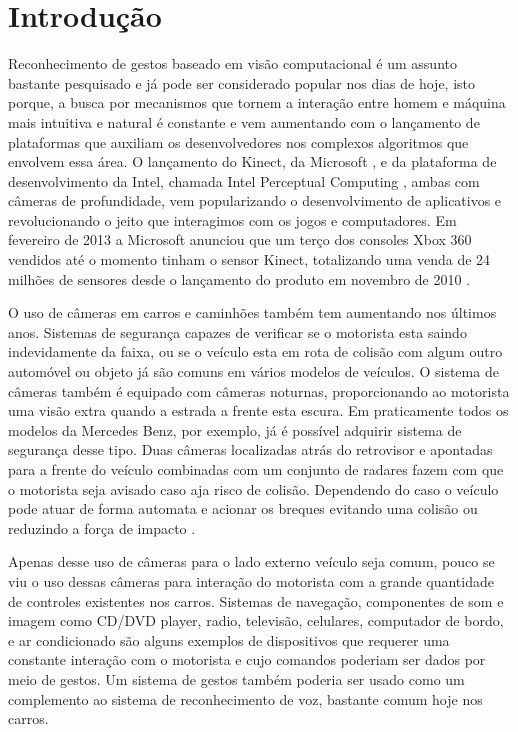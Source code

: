 \chapter{Introdução}

Reconhecimento de gestos baseado em visão computacional é um assunto bastante pesquisado e já pode ser considerado popular nos dias de hoje, isto porque, a busca por mecanismos que tornem a interação entre homem e máquina mais intuitiva e natural é constante e vem aumentando com o lançamento de plataformas que auxiliam os desenvolvedores nos complexos algoritmos que envolvem essa área.
O lançamento do Kinect, da Microsoft \cite{kinect}, e da plataforma de desenvolvimento da Intel, chamada Intel Perceptual Computing \cite{intel},  ambas com câmeras de profundidade, vem popularizando o desenvolvimento de aplicativos e revolucionando o jeito que interagimos com os jogos e computadores. Em fevereiro de 2013 a Microsoft anunciou que um terço dos consoles Xbox 360 vendidos até o momento tinham o sensor Kinect, totalizando  uma venda de 24 milhões de sensores desde o lançamento do produto em novembro de 2010 \cite{news:kinect_sales}.

O uso de câmeras em carros e caminhões também tem aumentando nos últimos anos. Sistemas de segurança capazes de verificar se o motorista esta saindo indevidamente da faixa, ou se o veículo esta em rota de colisão com algum outro automóvel ou objeto já são comuns em vários modelos de veículos. O sistema de câmeras também é equipado com câmeras noturnas, proporcionando ao motorista uma visão extra quando a estrada a frente esta escura. Em praticamente todos os modelos da Mercedes Benz, por exemplo, já é possível adquirir sistema de segurança desse tipo. Duas câmeras localizadas atrás do retrovisor e apontadas para a frente do veículo combinadas com um conjunto de radares fazem com que o motorista seja avisado caso aja risco de colisão. Dependendo do caso o veículo pode atuar de forma automata e acionar os breques evitando uma colisão ou reduzindo a força de impacto \cite{mercedes_youtube} \cite{mercedes_safety}. 

Apenas desse uso de câmeras para o lado externo veículo seja comum, pouco se viu o uso dessas câmeras para interação do motorista com a grande quantidade de controles existentes nos carros. Sistemas de navegação, componentes de som e imagem como CD/DVD player, radio, televisão, celulares, computador de bordo, e ar condicionado são alguns exemplos de dispositivos que requerer uma constante interação com o motorista e cujo comandos poderiam ser dados por meio de gestos.
Um sistema de gestos também poderia ser usado como um complemento ao sistema de reconhecimento de voz, bastante comum hoje nos carros.

